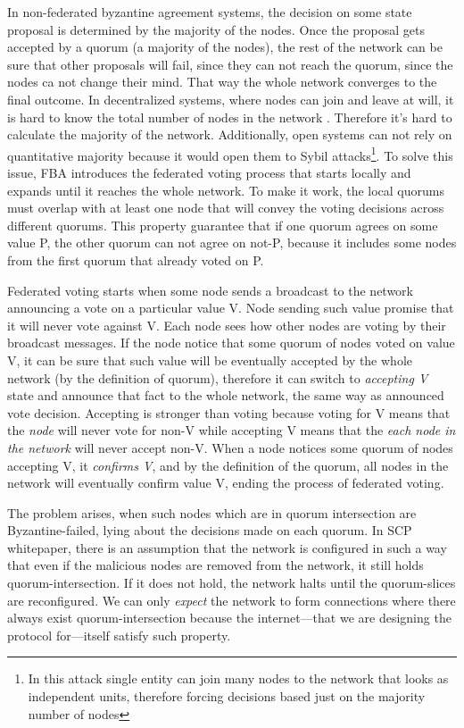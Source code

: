 In non-federated byzantine agreement systems, the decision on some state proposal is determined by the majority of the nodes. Once the proposal gets accepted by a quorum (a majority of the nodes), the rest of the network can be sure that other proposals will fail, since they can not reach the quorum, since the nodes ca not change their mind. That way the whole network converges to the final outcome.
In decentralized systems, where nodes can join and leave at will, it is hard to know the total number of nodes in the network . Therefore it's hard to calculate the majority of the network. Additionally, open systems can not rely on quantitative majority because it would open them to Sybil attacks\footnote{In this attack single entity can join many nodes to the network that looks as independent units, therefore forcing decisions based just on the majority number of nodes}. To solve this issue, FBA introduces the federated voting process that starts locally and expands until it reaches the whole network. To make it work, the local quorums must overlap with at least one node that will convey the voting decisions across different quorums. This property guarantee that if one quorum agrees on some value P, the other quorum can not agree on not-P, because it includes some nodes from the first quorum that already voted on P.

Federated voting starts when some node sends a broadcast to the network announcing a vote on a particular value V. Node sending such value promise that it will never vote against V. Each node sees how other nodes are voting by their broadcast messages. If the node notice that some quorum of nodes voted on value V, it can be sure that such value will be eventually accepted by the whole network (by the definition of quorum), therefore it can switch to \textit{accepting V} state and announce that fact to the whole network, the same way as announced vote decision. Accepting is stronger than voting because voting for V means that the \textit{node} will never vote for non-V while accepting V means that the \textit{each node in the network} will never accept non-V. When a node notices some quorum of nodes accepting V, it \textit{confirms V}, and by the definition of the quorum, all nodes in the network will eventually confirm value V, ending the process of federated voting.

The problem arises, when such nodes which are in quorum intersection are Byzantine-failed, lying about the decisions made on each quorum. In SCP whitepaper, there is an assumption that the network is configured in such a way that even if the malicious nodes are removed from the network, it still holds quorum-intersection. If it does not hold, the network halts until the quorum-slices are reconfigured.
We can only \textit{expect} the network to form connections where there always exist quorum-intersection because the internet––that we are designing the protocol for––itself satisfy such property.

